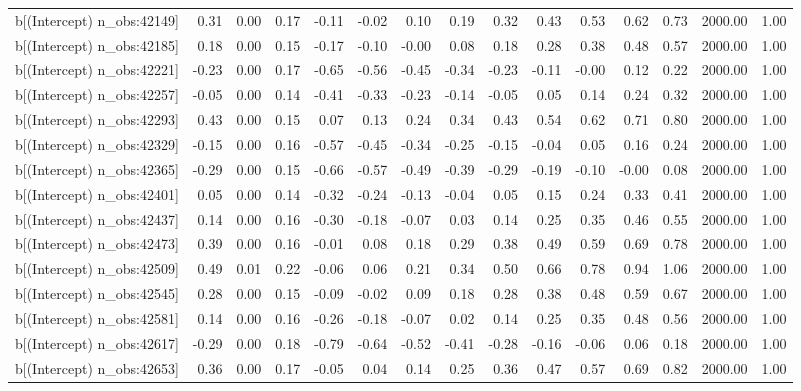 \begin{table}[ht]
\begin{tabular}{rrrrrrrrrrrrrrr}
  b[(Intercept) n\_obs:42149] & 0.31 & 0.00 & 0.17 & -0.11 & -0.02 & 0.10 & 0.19 & 0.32 & 0.43 & 0.53 & 0.62 & 0.73 & 2000.00 & 1.00 \\ 
  b[(Intercept) n\_obs:42185] & 0.18 & 0.00 & 0.15 & -0.17 & -0.10 & -0.00 & 0.08 & 0.18 & 0.28 & 0.38 & 0.48 & 0.57 & 2000.00 & 1.00 \\ 
  b[(Intercept) n\_obs:42221] & -0.23 & 0.00 & 0.17 & -0.65 & -0.56 & -0.45 & -0.34 & -0.23 & -0.11 & -0.00 & 0.12 & 0.22 & 2000.00 & 1.00 \\ 
  b[(Intercept) n\_obs:42257] & -0.05 & 0.00 & 0.14 & -0.41 & -0.33 & -0.23 & -0.14 & -0.05 & 0.05 & 0.14 & 0.24 & 0.32 & 2000.00 & 1.00 \\ 
  b[(Intercept) n\_obs:42293] & 0.43 & 0.00 & 0.15 & 0.07 & 0.13 & 0.24 & 0.34 & 0.43 & 0.54 & 0.62 & 0.71 & 0.80 & 2000.00 & 1.00 \\ 
  b[(Intercept) n\_obs:42329] & -0.15 & 0.00 & 0.16 & -0.57 & -0.45 & -0.34 & -0.25 & -0.15 & -0.04 & 0.05 & 0.16 & 0.24 & 2000.00 & 1.00 \\ 
  b[(Intercept) n\_obs:42365] & -0.29 & 0.00 & 0.15 & -0.66 & -0.57 & -0.49 & -0.39 & -0.29 & -0.19 & -0.10 & -0.00 & 0.08 & 2000.00 & 1.00 \\ 
  b[(Intercept) n\_obs:42401] & 0.05 & 0.00 & 0.14 & -0.32 & -0.24 & -0.13 & -0.04 & 0.05 & 0.15 & 0.24 & 0.33 & 0.41 & 2000.00 & 1.00 \\ 
  b[(Intercept) n\_obs:42437] & 0.14 & 0.00 & 0.16 & -0.30 & -0.18 & -0.07 & 0.03 & 0.14 & 0.25 & 0.35 & 0.46 & 0.55 & 2000.00 & 1.00 \\ 
  b[(Intercept) n\_obs:42473] & 0.39 & 0.00 & 0.16 & -0.01 & 0.08 & 0.18 & 0.29 & 0.38 & 0.49 & 0.59 & 0.69 & 0.78 & 2000.00 & 1.00 \\ 
  b[(Intercept) n\_obs:42509] & 0.49 & 0.01 & 0.22 & -0.06 & 0.06 & 0.21 & 0.34 & 0.50 & 0.66 & 0.78 & 0.94 & 1.06 & 2000.00 & 1.00 \\ 
  b[(Intercept) n\_obs:42545] & 0.28 & 0.00 & 0.15 & -0.09 & -0.02 & 0.09 & 0.18 & 0.28 & 0.38 & 0.48 & 0.59 & 0.67 & 2000.00 & 1.00 \\ 
  b[(Intercept) n\_obs:42581] & 0.14 & 0.00 & 0.16 & -0.26 & -0.18 & -0.07 & 0.02 & 0.14 & 0.25 & 0.35 & 0.48 & 0.56 & 2000.00 & 1.00 \\ 
  b[(Intercept) n\_obs:42617] & -0.29 & 0.00 & 0.18 & -0.79 & -0.64 & -0.52 & -0.41 & -0.28 & -0.16 & -0.06 & 0.06 & 0.18 & 2000.00 & 1.00 \\ 
  b[(Intercept) n\_obs:42653] & 0.36 & 0.00 & 0.17 & -0.05 & 0.04 & 0.14 & 0.25 & 0.36 & 0.47 & 0.57 & 0.69 & 0.82 & 2000.00 & 1.00 \\ 

\end{tabular}
\end{table}
